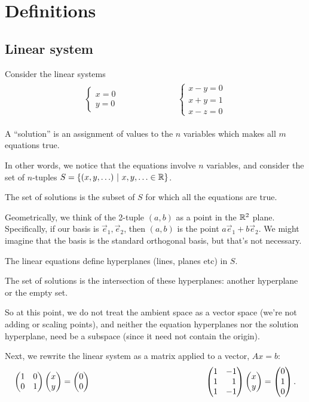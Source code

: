\newcommand{\mat}{\matMMxNN}

\section{Definitions}

\subsection{Linear system}

Consider the linear systems
\begin{align*}
  \begin{array}{cc}
    \begin{cases}
      x = 0\\
      y = 0
    \end{cases}
    ~~~~~~~~~~~~~~~~~~~~~~~~~~~~&
    \begin{cases}
      x - y = 0\\
      x + y = 1\\
      x - z = 0
    \end{cases}
  \end{array}
\end{align*}

A ``solution'' is an assignment of values to the $n$ variables which makes all
$m$ equations true.

In other words, we notice that the equations involve $n$ variables, and
consider the set of $n$-tuples
$S = \{(x, y, \ldots) ~|~ x, y, \ldots \in \mathbb{R}\}$.

The set of solutions is the subset of $S$ for which all the equations are true.

Geometrically, we think of the 2-tuple $(a, b)$ as a point in the $\mathbb{R}^2$
plane. Specifically, if our basis is $\vec e_1, \vec e_2$, then $(a, b)$ is the
point $a\vec e_1 + b\vec e_2$. We might imagine that the basis is the standard
orthogonal basis, but that's not necessary.

The linear equations define hyperplanes (lines, planes etc) in $S$.

The set of solutions is the intersection of these hyperplanes: another
hyperplane or the empty set.

So at this point, we do not treat the ambient space as a vector space (we're
not adding or scaling points), and neither the equation hyperplanes nor the
solution hyperplane, need be a subspace (since it need not contain the origin).

Next, we rewrite the linear system as a matrix applied to a vector, $Ax = b$:
\begin{align*}
  \begin{array}{cc}
    \mat{1}{0}
        {0}{1} \vecMM{x}{y} = \vecMM{0}{0}
    ~~~~~~~~~~~~~~~~~~~~~~~~~~~~~~~~~~~~~~~&
    \matMMMxNN{1}{-1}
              {1}{~~1}
              {1}{-1} \vecMM{x}{y} = \vecMMM{0}{1}{0}.
  \end{array}
\end{align*}

